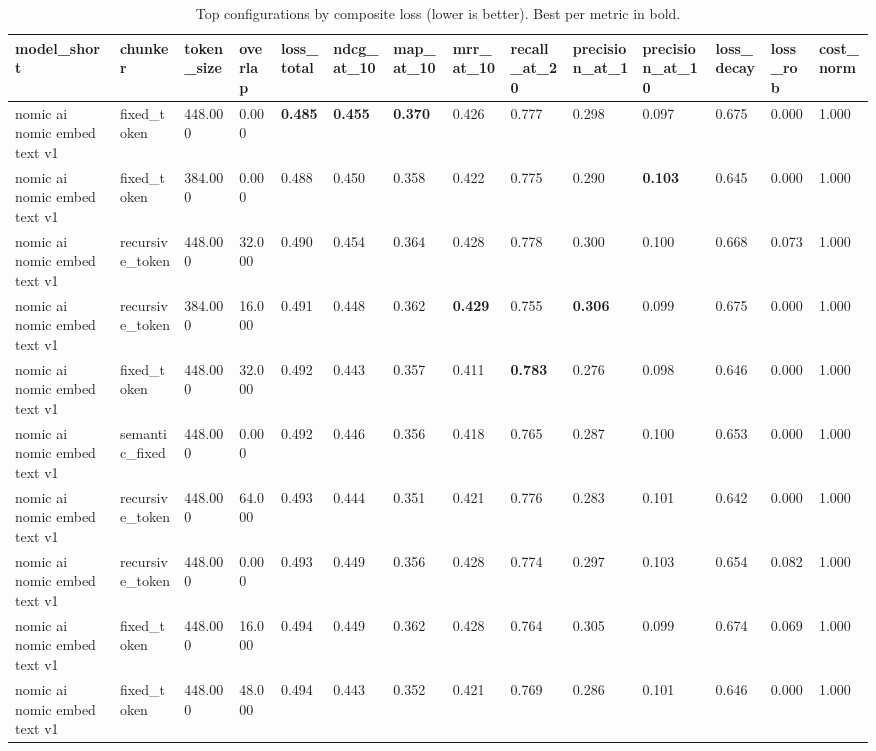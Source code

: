 \begin{table}[t]
\centering
\small
\begin{tabular}{l l l l l l l l l l l l l l}
\toprule
model_short & chunker & token_size & overlap & loss_total & ndcg_at_10 & map_at_10 & mrr_at_10 & recall_at_20 & precision_at_1 & precision_at_10 & loss_decay & loss_rob & cost_norm \\
\midrule
nomic ai nomic embed text v1 & fixed_token & 448.000 & 0.000 & \textbf{0.485} & \textbf{0.455} & \textbf{0.370} & 0.426 & 0.777 & 0.298 & 0.097 & 0.675 & 0.000 & 1.000 \\
nomic ai nomic embed text v1 & fixed_token & 384.000 & 0.000 & 0.488 & 0.450 & 0.358 & 0.422 & 0.775 & 0.290 & \textbf{0.103} & 0.645 & 0.000 & 1.000 \\
nomic ai nomic embed text v1 & recursive_token & 448.000 & 32.000 & 0.490 & 0.454 & 0.364 & 0.428 & 0.778 & 0.300 & 0.100 & 0.668 & 0.073 & 1.000 \\
nomic ai nomic embed text v1 & recursive_token & 384.000 & 16.000 & 0.491 & 0.448 & 0.362 & \textbf{0.429} & 0.755 & \textbf{0.306} & 0.099 & 0.675 & 0.000 & 1.000 \\
nomic ai nomic embed text v1 & fixed_token & 448.000 & 32.000 & 0.492 & 0.443 & 0.357 & 0.411 & \textbf{0.783} & 0.276 & 0.098 & 0.646 & 0.000 & 1.000 \\
nomic ai nomic embed text v1 & semantic_fixed & 448.000 & 0.000 & 0.492 & 0.446 & 0.356 & 0.418 & 0.765 & 0.287 & 0.100 & 0.653 & 0.000 & 1.000 \\
nomic ai nomic embed text v1 & recursive_token & 448.000 & 64.000 & 0.493 & 0.444 & 0.351 & 0.421 & 0.776 & 0.283 & 0.101 & 0.642 & 0.000 & 1.000 \\
nomic ai nomic embed text v1 & recursive_token & 448.000 & 0.000 & 0.493 & 0.449 & 0.356 & 0.428 & 0.774 & 0.297 & 0.103 & 0.654 & 0.082 & 1.000 \\
nomic ai nomic embed text v1 & fixed_token & 448.000 & 16.000 & 0.494 & 0.449 & 0.362 & 0.428 & 0.764 & 0.305 & 0.099 & 0.674 & 0.069 & 1.000 \\
nomic ai nomic embed text v1 & fixed_token & 448.000 & 48.000 & 0.494 & 0.443 & 0.352 & 0.421 & 0.769 & 0.286 & 0.101 & 0.646 & 0.000 & 1.000 \\
\bottomrule
\end{tabular}
\caption{Top configurations by composite loss (lower is better). Best per metric in bold.}
\label{tab:leaderboard}
\end{table}